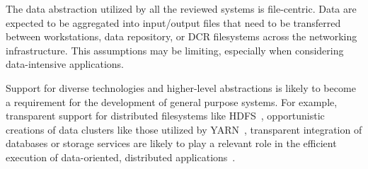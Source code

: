 \documentclass{sig-alternate}
\begin{document}
The data abstraction utilized by all the reviewed \pilot systems is
file-centric. Data are expected to be aggregated into input/output files that
need to be transferred between workstations, data repository, or DCR filesystems
across the networking infrastructure. This assumptions may be limiting,
especially when considering data-intensive applications.

Support for diverse technologies and higher-level abstractions is likely to
become a requirement for the development of general purpose \pilot systems. For
example, transparent support for distributed filesystems like
HDFS~\cite{borthakur2008}, opportunistic creations of data clusters like those
utilized by YARN~\cite{vavilapalli2013}, transparent integration of databases or
storage services are likely to play a relevant role in the efficient execution
of data-oriented, distributed
applications~\cite{rey2015open,sboner2015primer,zhang2010}.


\end{document}
